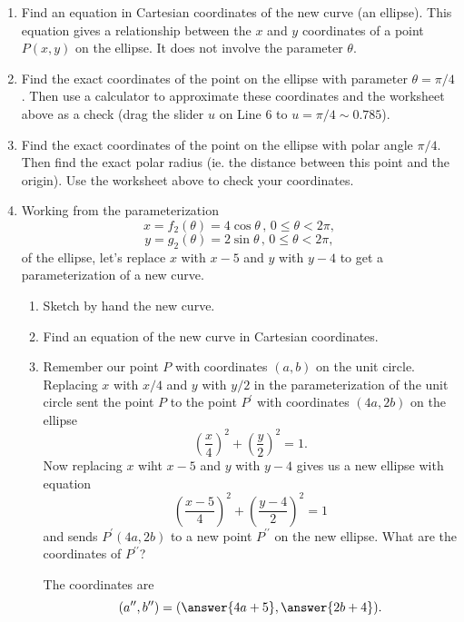 \documentclass{ximera}
\begin{document}
\begin{example}
\begin{enumerate}
\item Find an equation in Cartesian coordinates of the new curve (an ellipse). This equation gives a relationship between the $x$ and $y$ coordinates of a point $P(x,y)$ on the ellipse. It does not involve the parameter $\theta$.

\item Find the exact coordinates of the point on the ellipse with parameter $\theta=\pi/4$. Then use a calculator to approximate these coordinates and the worksheet above as a check (drag the slider $u$ on Line 6 to $u=\pi/4 \sim 0.785$).

\item Find the exact coordinates of the point on the ellipse with polar angle $\pi/4$. Then find the exact polar radius (ie. the distance between this point and the origin). Use the worksheet above to check your coordinates.

\item Working from the parameterization 
\[ 
     x = f_2 (\theta) = 4\cos\theta \, , \, 0\leq \theta <2\pi ,
\]
\[
   y = g_2 (\theta) = 2\sin\theta \, , \, 0\leq \theta <2\pi ,
\]
of the ellipse, let's replace $x$ with $x-5$ and $y$ with $y-4$ to get a parameterization of a new curve.

\begin{enumerate}
\item Sketch by hand the new curve.

\item Find an equation of the new curve in Cartesian coordinates.

\item Remember our point $P$ with coordinates $(a,b)$ on the unit circle. Replacing $x$ with $x/4$ and $y$ with $y/2$ in the parameterization of the unit circle sent the point $P$ to the point $P^\prime$ with coordinates $(4a, 2b)$ on the ellipse
\[
  \left( \frac{x}{4} \right)^2 + \left( \frac{y}{2} \right)^2 = 1.
\]
Now replacing $x$ wiht $x-5$ and $y$ with $y-4$ gives us a new ellipse with equation
\[
  \left( \frac{x-5}{4} \right)^2 + \left( \frac{y-4}{2} \right)^2 = 1
\]
and sends $P^\prime(4a,2b)$ to a new point $P^{\prime\prime}$ on the new ellipse. What are the coordinates of $P^{\prime\prime}$?

The coordinates are 
\[
   (a^{\prime\prime} , b^{\prime\prime}) = (\answer{4a+5} , \answer{2b+4} ) .
\]


\end{enumerate}

\end{enumerate}
\end{example}
\end{document}
